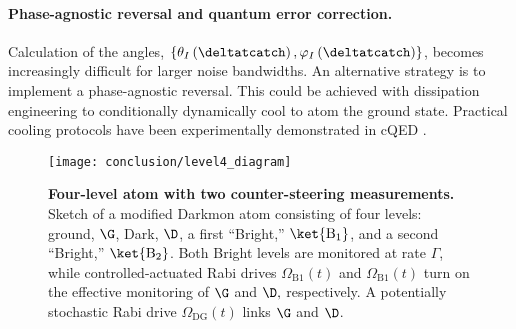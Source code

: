 \paragraph{Phase-agnostic reversal and quantum error correction.}

Calculation of the angles, $\left\{ \theta_{I}\left(\deltatcatch\right),\varphi_{I}\left(\deltatcatch\right)\right\} $,
becomes increasingly difficult for larger noise bandwidths. An alternative
strategy is to implement a phase-agnostic reversal. This could be
achieved with dissipation engineering \citep{Poyatos1996-qm-res-eng}
to conditionally dynamically cool to atom the ground state. Practical
cooling protocols have been experimentally demonstrated in cQED \citep{Valenzuela2006,Grajcar2008,Murch2012-bath-eng,Geerlings2013-reset,LiuYehan2016}. 

\begin{figure}
\begin{centering}
\texttt{[image: conclusion/level4\_diagram]}
\par\end{centering}
\caption[Four-level atom with two counter-steering measurements]{\label{fig:4lvlatom}\textbf{Four-level atom with two counter-steering
measurements.} Sketch of a modified Darkmon atom consisting of four
levels: ground, $\G$, Dark, $\D$, a first ``Bright,'' $\ket{\mathrm{B}_{1}}$,
and a second ``Bright,'' $\ket{\mathrm{B}_{2}}$. Both Bright levels
are monitored at rate $\Gamma$, while controlled-actuated Rabi drives
$\Omega_{\mathrm{B1}}\left(t\right)$ and $\Omega_{\mathrm{B1}}\left(t\right)$
turn on the effective monitoring of $\G$ and $\D,$ respectively.
A potentially stochastic Rabi drive $\Omega_{\mathrm{DG}}\left(t\right)$
links $\G$ and $\D$.}
\end{figure}

